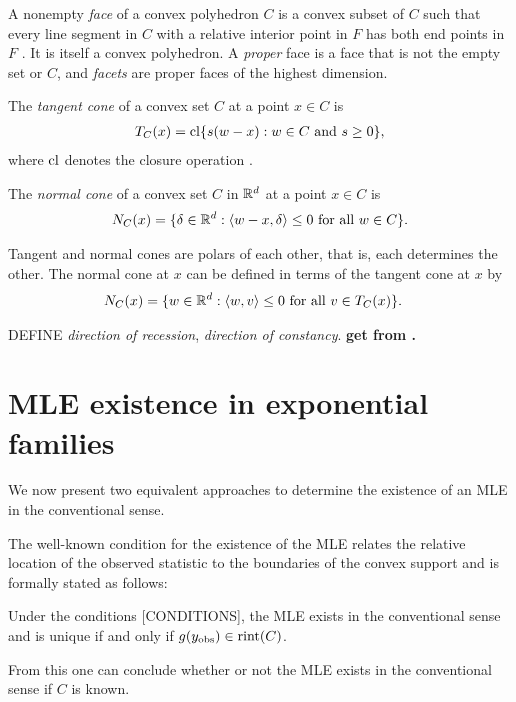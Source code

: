 A nonempty \emph{face} of a convex polyhedron $C$ is a convex subset of $C$ such that 
every line segment in $C$ with a relative interior point in $F$ has both end points in 
$F$ \citep{Rockafellar:1970}.  It is itself a convex polyhedron.
A \emph{proper} face is a face that is not the empty set or $C$, and 
\emph{facets} are proper faces of the highest dimension.

The \emph{tangent cone} of a convex set $C$ at a point $x \in C$ is
\begin{align*}
	T_C(x) = \operatorname{cl}\{s(w-x):w \in C \text{ and } s \geq 0 \},
\end{align*}
where $\operatorname{cl}$ denotes the closure operation \citep[Theorem 6.9]{Rockafellar}.  

The \emph{normal cone} of a convex set $C$ in ${\mathbb R}^d$ at a point $x \in C$ is 
\begin{align*}
	N_C(x) = \{ \delta \in {\mathbb R}^d: \langle w-x,\delta \rangle \leq 0 \text{ for all } w \in C 
\}.
\end{align*}

Tangent and normal cones are polars of each other, that is, each determines the other.  
The normal cone at $x$ can be defined in terms of the tangent cone at $x$ by
\begin{align*}
	N_C(x) 	&= \{ w \in {\mathbb R}^d: \langle  w, v  \rangle \leq 0 \text{ for all } v \in T_C(x) \}.
\end{align*}

DEFINE \emph{direction of recession}, \emph{direction of constancy}.  \textbf{get from 
\citep{Rockafellar:1970}.}



\section{MLE existence in exponential families}
We now present two equivalent approaches to determine the existence of an MLE
in the conventional sense.  

The well-known condition for the existence of the MLE \citep{Barndorff, Brown:1986} 
relates the relative location
of the observed statistic to the boundaries of the convex support
and is formally stated as follows:
\begin{theorem} \label{Thm:MLE rint}
Under the conditions [CONDITIONS], the MLE exists in the conventional sense and is 
unique if and only if 
$g(y_{\textrm{obs}}) \in \operatorname{rint}(C)$.
\end{theorem}

From this one can conclude whether or not the MLE exists in the conventional sense
if $C$ is known.

